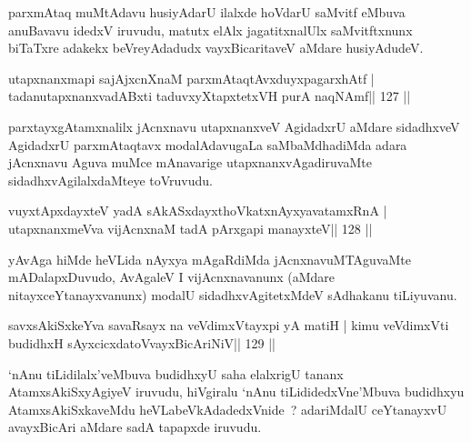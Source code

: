 \begin{artha}
parxmAtaq muMtAdavu husiyAdarU ilalxde hoVdarU saMvitf eMbuva anuBavavu idedxV iruvudu, matutx elAlx jagatitxnalUlx saMvitftxnunx biTaTxre adakekx beVreyAdadudx vayxBicaritaveV aMdare husiyAdudeV.
\end{artha}

\begin{shl}
\footnotemark[3]utapxnanxmapi sajAjxcnXnaM parxmAtaqtAvxduyxpagarxhAtf |
\footnotemark[4]tadanutapxnanxvadABxti taduvxyXtapxtetxVH purA naqNAmf\hfill || 127 ||
\end{shl}

\begin{artha}
parxtayxgAtamxnalilx jAcnxnavu utapxnanxveV AgidadxrU aMdare sidadhxveV AgidadxrU parxmAtaqtavx modalAdavugaLa saMbaMdhadiMda adara jAcnxnavu Aguva muMce mAnavarige utapxnanxvAgadiruvaMte sidadhxvAgilalxdaMteye toVruvudu.
\end{artha}


\begin{shl}
vuyxtApxdayxteV yadA sAkASxdayxthoVkatxnAyxyavatamxRnA |
utapxnanxmeVva vijAcnxnaM tadA pArxgapi manayxteV\hfill || 128 ||
\end{shl}

\begin{artha}
yAvAga hiMde heVLida nAyxya mAgaRdiMda jAcnxnavuMTAguvaMte mADalapxDuvudo, AvAgaleV I vijAcnxnavanunx (aMdare nitayxceYtanayxvanunx) modalU sidadhxvAgitetxMdeV sAdhakanu tiLiyuvanu.
\end{artha}

\begin{shl}
savxsAkiSxkeYva savaRsayx na veVdimxVtayxpi yA matiH |
kimu veVdimxVti budidhxH sAyxcicxdatoV\s vayxBicAriNiV\hfill || 129 ||
\end{shl}

\begin{artha}
`nAnu tiLidilalx'veMbuva budidhxyU saha elalxrigU tananx AtamxsAkiSxyAgiyeV iruvudu, hiVgiralu `nAnu tiLididedxVne'Mbuva budidhxyu AtamxsAkiSxkaveMdu heVLabeVkAdadedxVnide~? adariMdalU ceYtanayxvU avayxBicAri aMdare sadA tapapxde iruvudu.
\end{artha}


